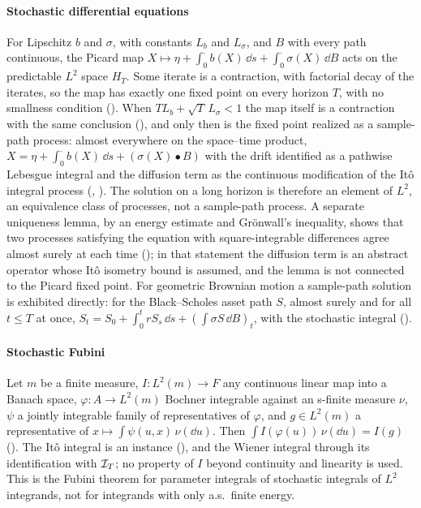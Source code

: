 \documentclass[11pt]{article}
\newcommand{\HT}{H_T}
\newcommand{\bulletB}{\mathbin{\bullet}}
\begin{document}
\paragraph{Stochastic differential equations}
For Lipschitz $b$ and $\sigma$, with constants $L_b$ and $L_\sigma$, and $B$ with every path continuous, the Picard map
$X\mapsto\eta+\int_0^\cdot b(X)\,\dd s+\int_0^\cdot\sigma(X)\,\dd B$ acts on the predictable $L^2$ space $\HT$. Some
iterate is a contraction, with factorial decay of the iterates, so the map has exactly one fixed point on every
horizon $T$, with no smallness condition (). When
$TL_b+\sqrt T\,L_\sigma<1$ the map itself is a contraction with the same conclusion
(), and only then is the fixed point realized as a sample-path process: almost
everywhere on the space--time product, $X=\eta+\int_0^\cdot b(X)\,\dd s+(\sigma(X)\bulletB B)$ with the drift
identified as a pathwise Lebesgue integral and the diffusion term as the continuous modification of the It\^o
integral process (, ). The solution on a long
horizon is therefore an element of $L^2$, an equivalence class of processes, not a sample-path process. A separate
uniqueness lemma, by an energy estimate and Gr\"onwall's inequality, shows that two processes satisfying the
equation with square-integrable differences agree almost surely at each time (); in
that statement the diffusion term is an abstract operator whose It\^o isometry bound is assumed, and the lemma is not
connected to the Picard fixed point. For geometric Brownian motion a sample-path solution is exhibited directly: for the
Black--Scholes asset path $S$, almost surely and for all $t\le T$ at once, $S_t=S_0+\int_0^trS_s\,\dd s+(\int\sigma S\,\dd B)_t$,
with the stochastic integral  ().

\paragraph{Stochastic Fubini}
Let $m$ be a finite measure, $I\colon L^2(m)\to F$ any continuous linear map into a Banach space, $\varphi\colon A\to L^2(m)$
Bochner integrable against an s-finite measure $\nu$, $\psi$ a jointly integrable family of representatives of
$\varphi$, and $g\in L^2(m)$ a representative of $x\mapsto\int\psi(u,x)\,\nu(\dd u)$. Then
$\int I(\varphi(u))\,\nu(\dd u)=I(g)$ (). The It\^o integral is an instance (), and the Wiener integral through its identification with
$\mathcal{I}_T$; no property of $I$ beyond continuity and linearity is used. This is the Fubini theorem for
parameter integrals of stochastic integrals of $L^2$ integrands, not for integrands with only a.s.\ finite
energy.
\end{document}
